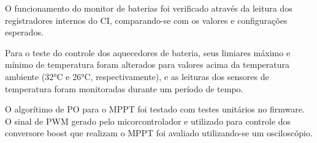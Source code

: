 O funcionamento do monitor de baterias foi verificado através da leitura dos registradores internos do CI, comparando-se com os valores e configurações esperados.

Para o teste do controle dos aquecedores de bateria, seus limiares máximo e mínimo de temperatura foram alterados para valores acima da temperatura ambiente (32°C e 26°C, respectivamente), e as leituras dos sensores de temperatura foram monitoradas durante um período de tempo.

O algorítimo de \gls{PO} para o \gls{MPPT} foi testado com testes unitários no firmware.
O sinal de \gls{PWM} gerado pelo micorcontrolador e utilizado para controle dos conversore boost que realizam o \gls{MPPT} foi avaliado utilizando-se um osciloscópio.